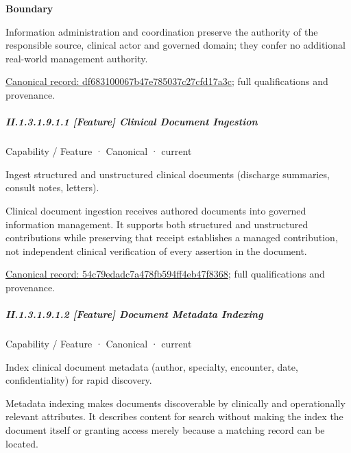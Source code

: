 \textbf{Boundary}



Information administration and coordination preserve the authority of the responsible source, clinical actor and governed domain; they confer no additional real-world management authority.


{\footnotesize \href{../../../../continuum/strategy/capability/df683100067b47e785037c27cfd17a3c.md}{Canonical record: df683100067b47e785037c27cfd17a3c}; full qualifications and provenance.}\par
\subparagraph*{II.1.3.1.9.1.1 [Feature] Clinical Document Ingestion}
\label{navigation:II.1.3.1.9.1.1}

\label{element:54c79edadc7a478fb594ff4eb47f8368}
{\small Capability / Feature · Canonical · current}\par

Ingest structured and unstructured clinical documents (discharge summaries, consult notes, letters).



Clinical document ingestion receives authored documents into governed information management. It supports both structured and unstructured contributions while preserving that receipt establishes a managed contribution, not independent clinical verification of every assertion in the document.


{\footnotesize \href{../../../../continuum/strategy/capability/feature/54c79edadc7a478fb594ff4eb47f8368.md}{Canonical record: 54c79edadc7a478fb594ff4eb47f8368}; full qualifications and provenance.}\par
\subparagraph*{II.1.3.1.9.1.2 [Feature] Document Metadata Indexing}
\label{navigation:II.1.3.1.9.1.2}

\label{element:0c85a269e90a4329b83d934f9061cd49}
{\small Capability / Feature · Canonical · current}\par

Index clinical document metadata (author, specialty, encounter, date, confidentiality) for rapid discovery.



Metadata indexing makes documents discoverable by clinically and operationally relevant attributes. It describes content for search without making the index the document itself or granting access merely because a matching record can be located.


